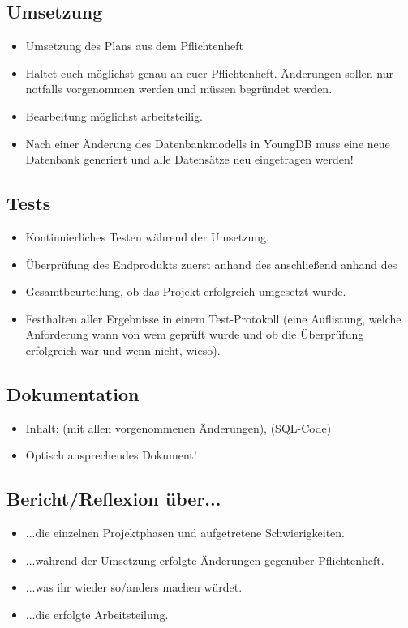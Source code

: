 {\subsection{Umsetzung}
\begin{itemize}
    \item Umsetzung des Plans aus dem Pflichtenheft
    \item Haltet euch möglichst genau an euer Pflichtenheft. Änderungen sollen nur notfalls vorgenommen werden und müssen begründet werden.
    \item Bearbeitung möglichst arbeitsteilig.
    \item {} Nach einer Änderung des Datenbankmodells in YoungDB muss eine neue Datenbank generiert und alle Datensätze neu eingetragen werden! 
\end{itemize}

\subsection{Tests}
\begin{itemize}
    \item Kontinuierliches Testen während der Umsetzung.
    \item Überprüfung des Endprodukts zuerst anhand des  anschließend anhand des 
    \item Gesamtbeurteilung, ob das Projekt erfolgreich umgesetzt wurde.
    \item Festhalten aller Ergebnisse in einem Test-Protokoll (eine Auflistung, welche Anforderung wann von wem geprüft wurde und ob die Überprüfung erfolgreich war und wenn nicht, wieso).
\end{itemize}

\subsection{Dokumentation}
\begin{itemize}
    \item Inhalt:  (mit allen vorgenommenen Änderungen),  (SQL-Code)
    \item Optisch ansprechendes Dokument!
\end{itemize}

\subsection{Bericht/Reflexion über...}
\begin{itemize}
    \item ...die einzelnen Projektphasen und aufgetretene Schwierigkeiten.
    \item ...während der Umsetzung erfolgte Änderungen gegenüber Pflichtenheft.
    \item ...was ihr wieder so/anders machen würdet.
    \item ...die erfolgte Arbeitsteilung.
\end{itemize}

}
